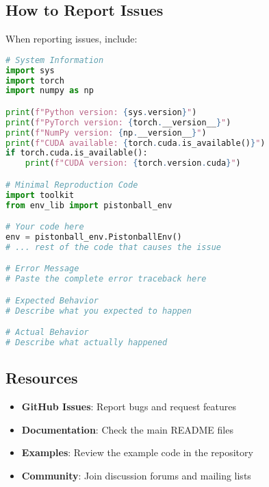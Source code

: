\subsection{How to Report Issues}

When reporting issues, include:

\begin{lstlisting}[language=python, caption=Issue Report Template]
# System Information
import sys
import torch
import numpy as np

print(f"Python version: {sys.version}")
print(f"PyTorch version: {torch.__version__}")
print(f"NumPy version: {np.__version__}")
print(f"CUDA available: {torch.cuda.is_available()}")
if torch.cuda.is_available():
    print(f"CUDA version: {torch.version.cuda}")

# Minimal Reproduction Code
import toolkit
from env_lib import pistonball_env

# Your code here
env = pistonball_env.PistonballEnv()
# ... rest of the code that causes the issue

# Error Message
# Paste the complete error traceback here

# Expected Behavior
# Describe what you expected to happen

# Actual Behavior
# Describe what actually happened
\end{lstlisting}

\subsection{Resources}

\begin{itemize}
    \item \textbf{GitHub Issues}: Report bugs and request features
    \item \textbf{Documentation}: Check the main README files
    \item \textbf{Examples}: Review the example code in the repository
    \item \textbf{Community}: Join discussion forums and mailing lists
\end{itemize} 